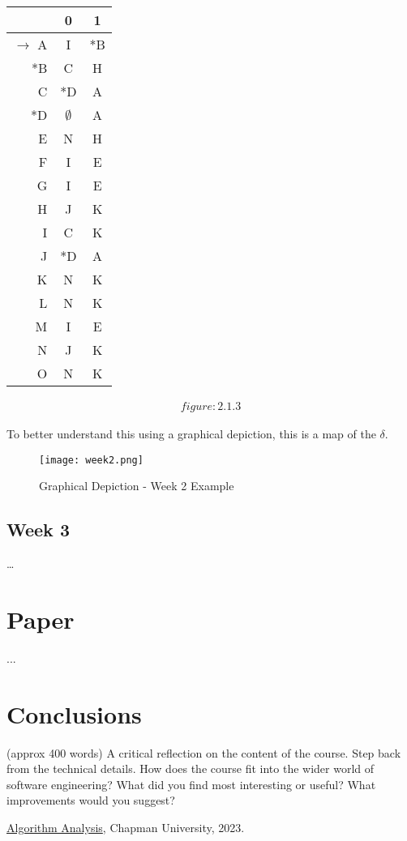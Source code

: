 \documentclass{article}
\theoremstyle{theorem}
\theoremstyle{definition}
\theoremstyle{remark}
\begin{document}
\begin{table}[h!] %
\centering
\begin{tabular}{r||c|c}
    & 0 & 1 \\
    \hline
    $\rightarrow$ A & I & *B \\
    *B & C & H \\
    C & *D & A \\
    *D & $\emptyset$ & A \\
    E & N & H \\
    F & I & E \\
    G & I & E \\
    H & J & K \\
    I & C & K \\
    J & *D & A \\
    K & N & K \\
    L & N & K \\
    M & I & E \\
    N & J & K \\
    O & N & K \\
\end{tabular}
\begin{align*}
figure:2.1.3
\end{align*}
\end{table}


\pagebreak
\medskip\noindent
To better understand this using a graphical depiction, this is a map of the $\delta$.

\begin{figure}[h!]
    \centering
    \texttt{[image: week2.png]}
    \caption{Graphical Depiction - Week 2 Example}
    \label{fig:Graphical Depiction - Week 2 Example}
\end{figure}

\subsection{Week 3}

\ldots

\section{Paper}

...

\section{Conclusions}\label{conclusions}

(approx 400 words) A critical reflection on the content of the course. Step back from the technical details. How does the course fit into the wider world of software engineering? What did you find most interesting or useful? What improvements would you suggest?

\begin{thebibliography}{99}
 \href{https://github.com/alexhkurz/algorithm-analysis-2023}{Algorithm Analysis}, Chapman University, 2023.
\end{thebibliography}
\end{document}

